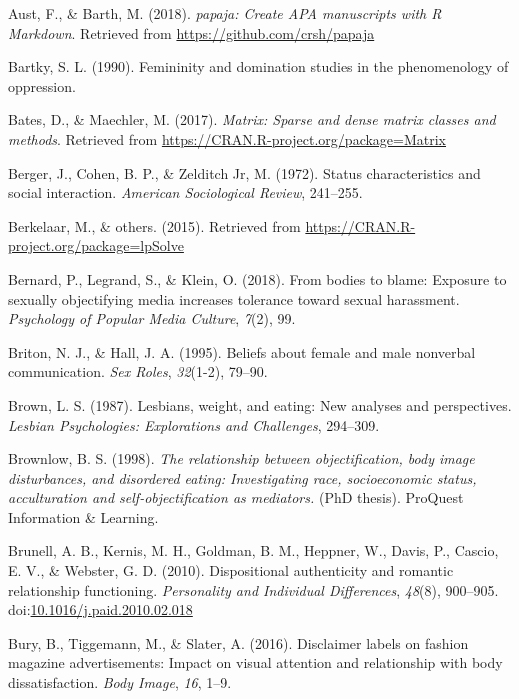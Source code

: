\documentclass[
  man]{apa6}
\begin{document}
\leavevmode\hypertarget{ref-R-papaja}{}%
Aust, F., \& Barth, M. (2018). \emph{papaja: Create APA manuscripts with R Markdown}. Retrieved from \url{https://github.com/crsh/papaja}

\leavevmode\hypertarget{ref-Bartky}{}%
Bartky, S. L. (1990). Femininity and domination studies in the phenomenology of oppression.

\leavevmode\hypertarget{ref-R-Matrix}{}%
Bates, D., \& Maechler, M. (2017). \emph{Matrix: Sparse and dense matrix classes and methods}. Retrieved from \url{https://CRAN.R-project.org/package=Matrix}

\leavevmode\hypertarget{ref-berger1972}{}%
Berger, J., Cohen, B. P., \& Zelditch Jr, M. (1972). Status characteristics and social interaction. \emph{American Sociological Review}, 241--255.

\leavevmode\hypertarget{ref-R-lpSolve}{}%
Berkelaar, M., \& others. (2015). Retrieved from \url{https://CRAN.R-project.org/package=lpSolve}

\leavevmode\hypertarget{ref-bernard2018bodies}{}%
Bernard, P., Legrand, S., \& Klein, O. (2018). From bodies to blame: Exposure to sexually objectifying media increases tolerance toward sexual harassment. \emph{Psychology of Popular Media Culture}, \emph{7}(2), 99.

\leavevmode\hypertarget{ref-briton1995}{}%
Briton, N. J., \& Hall, J. A. (1995). Beliefs about female and male nonverbal communication. \emph{Sex Roles}, \emph{32}(1-2), 79--90.

\leavevmode\hypertarget{ref-brown1987lesbians}{}%
Brown, L. S. (1987). Lesbians, weight, and eating: New analyses and perspectives. \emph{Lesbian Psychologies: Explorations and Challenges}, 294--309.

\leavevmode\hypertarget{ref-brownlow1998relationship}{}%
Brownlow, B. S. (1998). \emph{The relationship between objectification, body image disturbances, and disordered eating: Investigating race, socioeconomic status, acculturation and self-objectification as mediators.} (PhD thesis). ProQuest Information \& Learning.

\leavevmode\hypertarget{ref-brunelletal2010}{}%
Brunell, A. B., Kernis, M. H., Goldman, B. M., Heppner, W., Davis, P., Cascio, E. V., \& Webster, G. D. (2010). Dispositional authenticity and romantic relationship functioning. \emph{Personality and Individual Differences}, \emph{48}(8), 900--905. doi:\href{https://doi.org/10.1016/j.paid.2010.02.018}{10.1016/j.paid.2010.02.018}

\leavevmode\hypertarget{ref-bury2016}{}%
Bury, B., Tiggemann, M., \& Slater, A. (2016). Disclaimer labels on fashion magazine advertisements: Impact on visual attention and relationship with body dissatisfaction. \emph{Body Image}, \emph{16}, 1--9.
\end{document}
